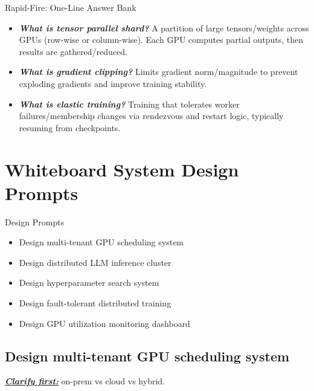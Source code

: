 \documentclass[12pt]{article}
\newcommand{\keysent}[1]{\textbf{\textit{\uline{#1}}}}
\let\origtextbf\textbf
\renewcommand{\textbf}[1]{\origtextbf{\textit{#1}}}
\begin{document}
\begin{bluebox}{Rapid-Fire: One-Line Answer Bank}
\begin{itemize}
\item \textbf{What is tensor parallel shard?} A partition of large tensors/weights across GPUs (row-wise or column-wise). Each GPU computes partial outputs, then results are gathered/reduced.

\item \textbf{What is gradient clipping?} Limits gradient norm/magnitude to prevent exploding gradients and improve training stability.

\item \textbf{What is elastic training?} Training that tolerates worker failures/membership changes via rendezvous and restart logic, typically resuming from checkpoints.
\end{itemize}
\end{bluebox}

\vspace{2cm}

\section{Whiteboard System Design Prompts}

\begin{greenbox}{Design Prompts}
\begin{itemize}
\item Design multi-tenant GPU scheduling system
\item Design distributed LLM inference cluster
\item Design hyperparameter search system
\item Design fault-tolerant distributed training
\item Design GPU utilization monitoring dashboard
\end{itemize}
\end{greenbox}

\subsection{Design multi-tenant GPU scheduling system}
\keysent{Clarify first:} on-prem vs cloud vs hybrid.
\end{document}
